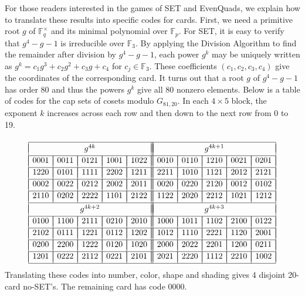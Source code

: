 \documentclass[12pt]{amsart}
\theoremstyle{definition}
\begin{document}
For those readers interested in the games of SET and EvenQuads, we
explain how to translate these results into specific codes for cards.
First, we need a primitive root $g$ of $\mathbb{F}_q^\times$ and its
minimal polynomial over $\mathbb{F}_p$.  For SET, it is easy to verify
that $g^4-g-1$ is irreducible over $\mathbb{F}_3$.  By applying the
Division Algorithm to find the remainder after division by $g^4-g-1$,
each power $g^k$ may be uniquely written as
$g^k=c_1g^3+c_2g^2+c_3g+c_4$ for $c_j\in \mathbb{F}_3$. These
coefficients $(c_1,c_2,c_3,c_4)$ give the coordinates of the
corresponding card. It turns out that a root $g$ of $g^4-g-1$ has
order 80 and thus the powers $g^k$ give all 80 nonzero elements.
Below is a table of codes for the cap sets of cosets modulo $G_{81,20}$. In
each $4\times 5$ block, the exponent $k$ increases across each row and
then down to the next row from 0 to 19.
$$
\begin{array}[t]{|*{5}{c|}|*{5}{c|}}\hline
  \multicolumn{5}{|c||}{}&\multicolumn{5}{|c|}{}\\[-10pt]
  \multicolumn{5}{|c||}{g^{4k}}&\multicolumn{5}{|c|}{g^{4k+1}}\\[2pt]\hline
                         &&&&&&&&& \\[-12pt]
  0001&0011&0121&1001&1022 & 0010&0110&1210&0021&0201 \\[2pt]\hline
                         &&&&&&&&& \\[-12pt]
  1220&0101&1111&2202&1211 & 2211&1010&1121&2012&2121 \\[2pt]\hline
                         &&&&&&&&& \\[-12pt]
  0002&0022&0212&2002&2011 & 0020&0220&2120&0012&0102 \\[2pt]\hline
                         &&&&&&&&& \\[-12pt]
  2110&0202&2222&1101&2122 & 1122&2020&2212&1021&1212 \\[2pt]\hline
  \multicolumn{5}{|c||}{}&\multicolumn{5}{|c|}{}\\[-10pt]
  \multicolumn{5}{|c||}{g^{4k+2}}&\multicolumn{5}{|c|}{g^{4k+3}}\\[2pt]\hline
                         &&&&&&&&& \\[-12pt]
  0100&1100&2111&0210&2010 & 1000&1011&1102&2100&0122 \\[2pt]\hline
                         &&&&&&&&& \\[-12pt]
  2102&0111&1221&0112&1202 & 1012&1110&2221&1120&2001 \\[2pt]\hline
                         &&&&&&&&& \\[-12pt]
  0200&2200&1222&0120&1020 & 2000&2022&2201&1200&0211 \\[2pt]\hline
                         &&&&&&&&& \\[-12pt]
  1201&0222&2112&0221&2101 & 2021&2220&1112&2210&1002 \\[2pt]\hline
\end{array}
$$
Translating these codes into number, color, shape and shading gives 4
disjoint 20-card no-SET's. The remaining card has code 0000.
\end{document}
